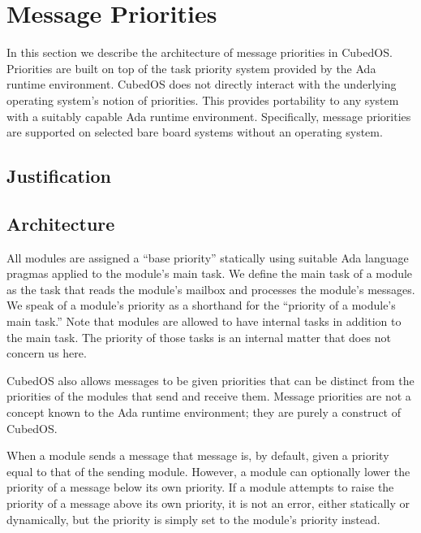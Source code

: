 
\section{Message Priorities}
\label{section-message-priorities}

In this section we describe the architecture of message priorities in CubedOS. Priorities are
built on top of the task priority system provided by the Ada runtime environment. CubedOS does
not directly interact with the underlying operating system's notion of priorities. This provides
portability to any system with a suitably capable Ada runtime environment. Specifically, message
priorities are supported on selected bare board systems without an operating system.

\subsection{Justification}


\subsection{Architecture}

All modules are assigned a ``base priority'' statically using suitable Ada language pragmas
applied to the module's main task. We define the main task of a module as the task that reads
the module's mailbox and processes the module's messages. We speak of a module's priority as a
shorthand for the ``priority of a module's main task.'' Note that modules are allowed to have
internal tasks in addition to the main task. The priority of those tasks is an internal matter
that does not concern us here.

CubedOS also allows messages to be given priorities that can be distinct from the priorities of
the modules that send and receive them. Message priorities are not a concept known to the Ada
runtime environment; they are purely a construct of CubedOS.

When a module sends a message that message is, by default, given a priority equal to that of the
sending module. However, a module can optionally lower the priority of a message below its own
priority. If a module attempts to raise the priority of a message above its own priority, it is
not an error, either statically or dynamically, but the priority is simply set to the module's
priority instead. 

